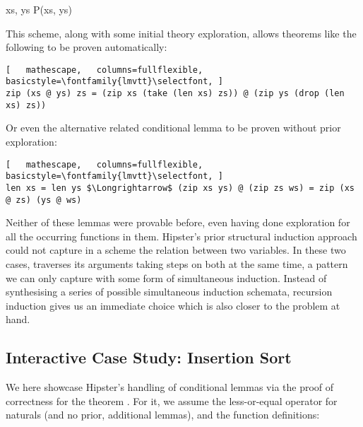 \vspace{2 mm}

  {\forall xs, \; ys \;\; P\;(xs,\; ys)}

\vspace{2 mm}

\noindent This scheme, along with some initial theory exploration, allows theorems like the following to be proven automatically:

\begin{lstlisting}[   mathescape,   columns=fullflexible,   basicstyle=\fontfamily{lmvtt}\selectfont, ]
zip (xs @ ys) zs = (zip xs (take (len xs) zs)) @ (zip ys (drop (len xs) zs))
\end{lstlisting}

\noindent Or even the alternative related conditional lemma to be proven without prior exploration:

\begin{lstlisting}[   mathescape,   columns=fullflexible,   basicstyle=\fontfamily{lmvtt}\selectfont, ]
len xs = len ys $\Longrightarrow$ (zip xs ys) @ (zip zs ws) = zip (xs @ zs) (ys @ ws)
\end{lstlisting}

\noindent Neither of these lemmas were provable before, even having done exploration for all the occurring functions in them.
%
Hipster's prior structural induction approach could not capture in a scheme the relation between two variables.
%
In these two cases,  traverses its arguments taking steps on both at the same time, a pattern we can only capture with some form of simultaneous induction.
%
Instead of synthesising a series of possible simultaneous induction schemata, recursion induction gives us an immediate choice which is also closer to the problem at hand.


\subsection{Interactive Case Study: Insertion Sort}

We here showcase Hipster's handling of conditional lemmas via the proof of correctness for the theorem .
%
For it, we assume the less-or-equal operator \isaCode{$\le$} for naturals (and no prior, additional lemmas), and the function definitions:

